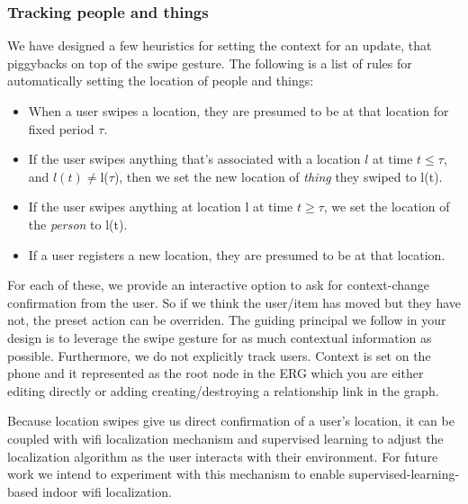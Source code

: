 \subsubsection{Tracking people and things}

We have designed a few heuristics for setting the context for an update, that piggybacks on top of the swipe gesture.
The following is a list of rules for automatically setting the location of people and things:

\begin{itemize}
\item When a user swipes a location, they are presumed to be at that location for fixed period $\tau$.
\item If the user swipes anything that's associated with a location $l$ at time $t \le \tau$, and $l(t)\ne$l($\tau$), 
		then we set the new location of \emph{thing} they swiped to l(t).
\item If the user swipes anything at location l at time $t \ge \tau$, we set the location of the \emph{person} to l(t).
\item If a user registers a new location, they are presumed to be at that location.
\end{itemize}

For each of these, we provide an interactive option to ask for context-change confirmation from the user.  So if we think the
user/item has moved but they have not, the preset action can be overriden.  The guiding principal we follow in your design
is to leverage the swipe gesture for as much contextual information as possible.  Furthermore, we do not explicitly track users.
Context is set on the phone and it represented as the root node in the ERG which you are either editing directly or
adding creating/destroying a relationship link in the graph.

Because location swipes give us direct confirmation of a user's location, it can be coupled with wifi localization mechanism and
supervised learning to adjust the localization algorithm as the user interacts with their environment. 
For future work we intend to experiment with this mechanism to enable supervised-learning-based indoor wifi localization.


